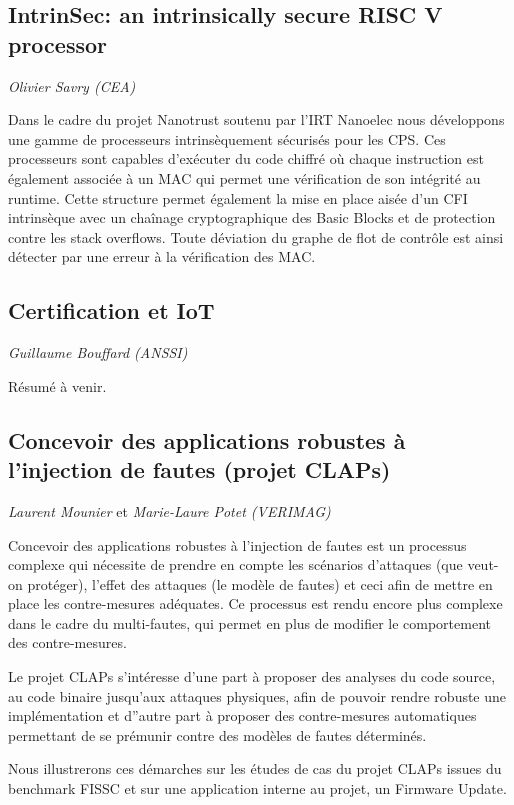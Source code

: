 \documentclass[a4paper,11pt]{article}
\begin{document}
\subsection{IntrinSec: an intrinsically secure RISC V processor}
\label{sec:org5ab65bf}
\emph{Olivier Savry (CEA)}

Dans le cadre du projet Nanotrust soutenu par l’IRT Nanoelec nous
développons une gamme de processeurs intrinsèquement sécurisés pour
les CPS. Ces processeurs sont capables d’exécuter du code chiffré où
chaque instruction est également associée à un MAC qui permet une
vérification de son intégrité au runtime. Cette structure permet
également la mise en place aisée d’un CFI intrinsèque avec un chaînage
cryptographique des Basic Blocks et de protection contre les stack
overflows. Toute déviation du graphe de flot de contrôle est ainsi
détecter par une erreur à la vérification des MAC.

\subsection{Certification et IoT}
\label{sec:org168486e}
\emph{Guillaume Bouffard (ANSSI)}

Résumé à venir.

\subsection{Concevoir des applications robustes à l'injection de fautes (projet CLAPs)}
\label{sec:org7a3ac6d}
\emph{Laurent Mounier} et \emph{Marie-Laure Potet (VERIMAG)}

Concevoir des applications robustes à l'injection de fautes est un
processus complexe qui nécessite de prendre en compte les scénarios
d'attaques (que veut-on protéger), l'effet des attaques (le modèle de
fautes) et ceci afin de mettre en place les contre-mesures
adéquates. Ce processus est rendu encore plus complexe dans le cadre
du multi-fautes, qui permet en plus de modifier le comportement des
contre-mesures.

Le projet CLAPs s'intéresse d'une part à proposer des analyses du code
source, au code binaire jusqu'aux attaques physiques, afin de pouvoir
rendre robuste une implémentation et d''autre part à proposer des
contre-mesures automatiques permettant de se prémunir contre des
modèles de fautes déterminés.

Nous illustrerons ces démarches sur les études de cas du projet CLAPs
issues du benchmark FISSC et sur une application interne au projet, un
Firmware Update.
\end{document}
